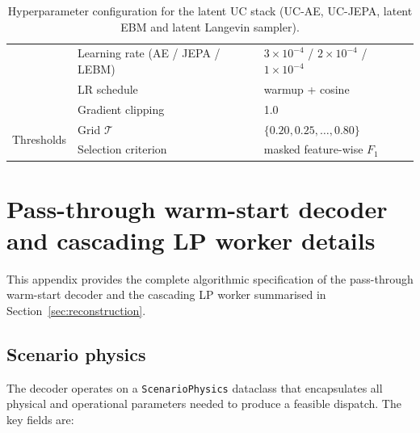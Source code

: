\documentclass{article}
\begin{document}
\begin{table}[H]
\begin{tabular}{lll}
  & Learning rate (AE / JEPA / LEBM) & $3{\times}10^{-4}$ / $2{\times}10^{-4}$ / $1{\times}10^{-4}$ \\
  & LR schedule & warmup + cosine \\
  & Gradient clipping & 1.0 \\
\midrule
\multirow{2}{*}{Thresholds}
  & Grid $\mathcal{T}$ & $\{0.20, 0.25, \dots, 0.80\}$ \\
  & Selection criterion & masked feature-wise $F_1$ \\
\bottomrule
\end{tabular}
\caption{Hyperparameter configuration for the latent UC stack (UC-AE, UC-JEPA, latent EBM and latent Langevin sampler).}
\label{tab:ebm_hyperparams}
\end{table}




\section{Pass-through warm-start decoder and cascading LP worker details}
\label{app:reconstruction_details}

This appendix provides the complete algorithmic specification of the pass-through warm-start decoder and the cascading LP worker summarised in Section~\ref{sec:reconstruction}.

\subsection{Scenario physics}

The decoder operates on a \texttt{ScenarioPhysics} dataclass that encapsulates all physical and operational parameters needed to produce a feasible dispatch. The key fields are:
\end{document}
